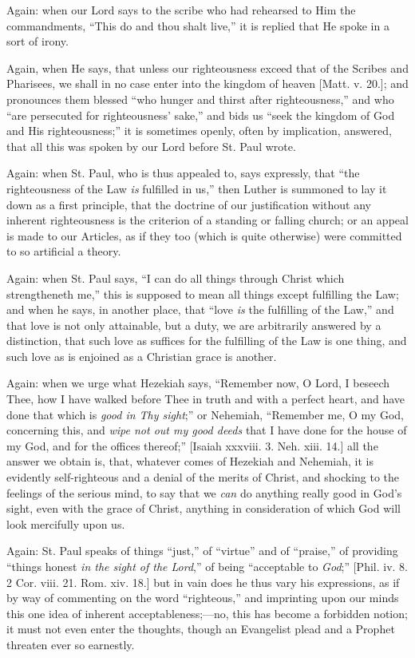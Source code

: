 Again: when our Lord says to the scribe who had rehearsed to Him
the commandments, ``This do and thou shalt live,'' it is
replied that He spoke in a sort of irony.

Again, when He says, that unless our righteousness exceed that of
the Scribes and Pharisees, we shall in no case enter into the
kingdom of heaven [Matt. v. 20.]; and pronounces them blessed
``who hunger and thirst after righteousness,'' and who
``are persecuted for righteousness' sake,'' and bids us
``seek the kingdom of God and His righteousness;'' it is
sometimes openly, often by implication, answered, that all this was
spoken by our Lord before St. Paul wrote.

Again: when St. Paul, who is thus appealed to, says expressly, that
``the righteousness of the Law \emph{is} fulfilled in us,''
then Luther is summoned to lay it down as a first principle, that the
doctrine of our justification without any inherent righteousness is
the criterion of a standing or falling church; or an appeal is made to
our Articles, as if they too (which is quite otherwise) were committed
to so artificial a theory.

Again: when St. Paul says, ``I can do all things through Christ
which strengtheneth me,'' this is supposed to mean all things
except fulfilling the Law; and when he says, in another place, that
``love \emph{is} the fulfilling of the Law,'' and that love is
not only attainable, but a duty, we are arbitrarily answered by a
distinction, that such love as suffices for the fulfilling of the Law
is one thing, and such love as is enjoined as a Christian grace is
another.

Again: when we urge what Hezekiah says, ``Remember now, O Lord,
I beseech Thee, how I have walked before Thee in truth and with a
perfect heart, and have done that which is \emph{good in Thy sight};''
or Nehemiah, ``Remember me, O my God, concerning this, and \emph{wipe
not out my good deeds} that I have done for the house of my
God, and for the offices thereof;'' [Isaiah xxxviii. 3. Neh. xiii.
14.] all the answer we obtain is, that, whatever comes of Hezekiah and
Nehemiah, it is evidently self-righteous and a denial of the merits of
Christ, and shocking to the feelings of the serious mind, to say that
we \emph{can} do anything really good in God's sight, even with the
grace of Christ, anything in consideration of which God will look
mercifully upon us.

Again: St. Paul speaks of things ``just,'' of
``virtue'' and of ``praise,'' of providing
``things honest \emph{in the sight of the Lord},'' of being
``acceptable to \emph{God};'' [Phil. iv. 8. 2 Cor. viii. 21.
Rom. xiv. 18.] but in vain does he thus vary his expressions, as if by
way of commenting on the word ``righteous,'' and imprinting
upon our minds this one idea of inherent acceptableness;—no, this
has become a forbidden notion; it must not even enter the thoughts,
though an Evangelist plead and a Prophet threaten ever so earnestly.

